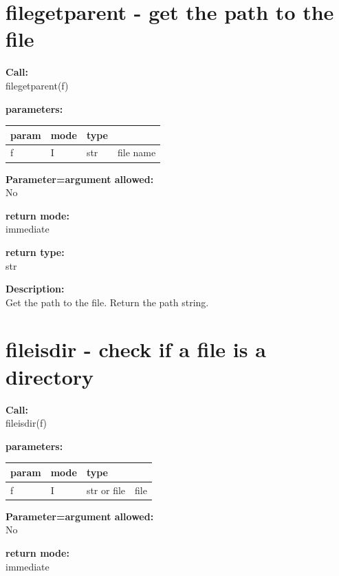     \section{filegetparent - get the path to the file}\label{sec:iffilegetparent}
        
        {\bf Call:} \\
        filegetparent(f)
        
        {\bf parameters:} \\
        \begin{tabular}{| l | l | l | l |}
        \hline
        param  & mode & type & \\
        \hline \hline
        f & I & str & file name \\ \hline
        \end{tabular}
        
        {\bf Parameter=argument allowed:} \\
        No
        
        {\bf return mode:} \\
        immediate

        {\bf return type:} \\
        str
        
        {\bf Description:} \\
        Get the path to the file. Return the path string.
 


    \section{fileisdir - check if a file is a directory}\label{sec:iffileisdir}
        
        {\bf Call:} \\
        fileisdir(f)
        
        {\bf parameters:} \\
        \begin{tabular}{| l | l | l | l |}
        \hline
        param  & mode & type & \\
        \hline \hline
        f & I & str or file & file \\ \hline
        \end{tabular}
        
        {\bf Parameter=argument allowed:} \\
        No
        
        {\bf return mode:} \\
        immediate


